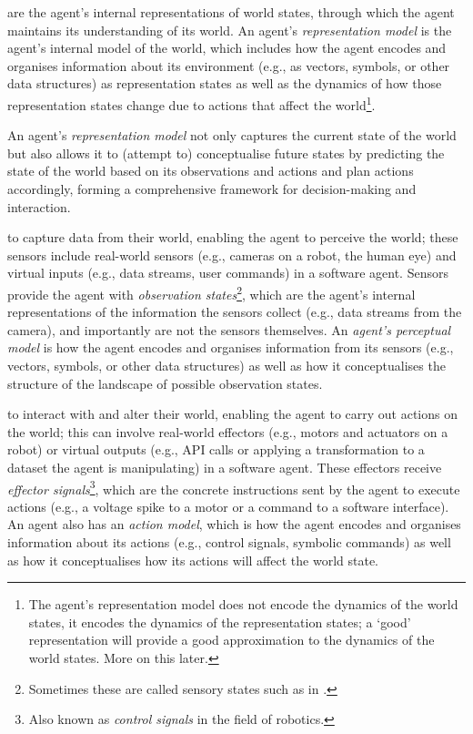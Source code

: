  are the agent's internal representations of world states, through which the agent maintains its understanding of its world.
An agent's \emph{representation model} is the agent's internal model of the world, which includes how the agent encodes and organises information about its environment (e.g., as vectors, symbols, or other data structures) as representation states as well as the dynamics of how those representation states change due to actions that affect the world\footnote{The agent's representation model does not encode the dynamics of the world states, it encodes the dynamics of the representation states; a `good' representation will provide a good approximation to the dynamics of the world states. More on this later.}.

An agent's \emph{representation model} not only captures the current state of the world but also allows it to (attempt to) conceptualise future states by predicting the state of the world based on its observations and actions and plan actions accordingly, forming a comprehensive framework for decision-making and interaction.

 to capture data from their world, enabling the agent to perceive the world; these sensors include real-world sensors (e.g., cameras on a robot, the human eye) and virtual inputs (e.g., data streams, user commands) in a software agent.
Sensors provide the agent with \emph{observation states}\footnote{Sometimes these are called sensory states such as in \cite{Ramstead2020}.}, which are the agent's internal representations of the information the sensors collect (e.g., data streams from the camera), and importantly are not the sensors themselves.
An \emph{agent's perceptual model} is how the agent encodes and organises information from its sensors (e.g., vectors, symbols, or other data structures) as well as how it conceptualises the structure of the landscape of possible observation states.

 to interact with and alter their world, enabling the agent to carry out actions on the world; this can involve real-world effectors (e.g., motors and actuators on a robot) or virtual outputs (e.g., API calls or applying a transformation to a dataset the agent is manipulating) in a software agent.
These effectors receive \emph{effector signals}\footnote{Also known as \emph{control signals} in the field of robotics.}, which are the concrete instructions sent by the agent to execute actions (e.g., a voltage spike to a motor or a command to a software interface).
An agent also has an \emph{action model}, which is how the agent encodes and organises information about its actions (e.g., control signals, symbolic commands) as well as how it conceptualises how its actions will affect the world state.

